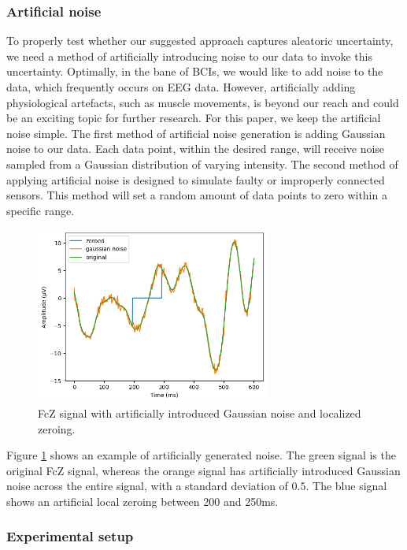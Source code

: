 \subsubsection{Artificial noise}

To properly test whether our suggested approach captures aleatoric uncertainty, we need a method of artificially introducing noise to our data to invoke this uncertainty. Optimally, in the bane of BCIs, we would like to add noise to the data, which frequently occurs on EEG data. However, artificially adding physiological artefacts, such as muscle movements, is beyond our reach and could be an exciting topic for further research. For this paper, we keep the artificial noise simple. The first method of artificial noise generation is adding Gaussian noise to our data. Each data point, within the desired range, will receive noise sampled from a Gaussian distribution of varying intensity. The second method of applying artificial noise is designed to simulate faulty or improperly connected sensors. This method will set a random amount of data points to zero within a specific range.

\begin{figure}[!tbp]
    \centering
        \includegraphics[width=7.7cm]{img/noise.png}
    \caption{FcZ signal with artificially introduced Gaussian noise and localized zeroing.}
    \label{fig:noise}
\end{figure}

Figure \ref{fig:noise} shows an example of artificially generated noise. The green signal is the original FcZ signal, whereas the orange signal has artificially introduced Gaussian noise across the entire signal, with a standard deviation of $0.5$. The blue signal shows an artificial local zeroing between 200 and 250ms.

\subsubsection{Experimental setup}

